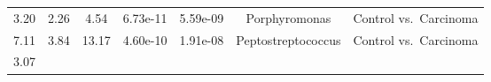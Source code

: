 \documentclass[12pt,]{article}
\begin{document}
\begin{longtable}[]{@{}ccccccc@{}}
\begin{minipage}[t]{0.06\columnwidth}\centering\strut
3.20\strut
\end{minipage} & \begin{minipage}[t]{0.10\columnwidth}\centering\strut
2.26\strut
\end{minipage} & \begin{minipage}[t]{0.10\columnwidth}\centering\strut
4.54\strut
\end{minipage} & \begin{minipage}[t]{0.08\columnwidth}\centering\strut
6.73e-11\strut
\end{minipage} & \begin{minipage}[t]{0.08\columnwidth}\centering\strut
5.59e-09\strut
\end{minipage} & \begin{minipage}[t]{0.23\columnwidth}\centering\strut
Porphyromonas\strut
\end{minipage} & \begin{minipage}[t]{0.16\columnwidth}\centering\strut
Control vs.~Carcinoma\strut
\end{minipage}\tabularnewline
\begin{minipage}[t]{0.06\columnwidth}\centering\strut
7.11\strut
\end{minipage} & \begin{minipage}[t]{0.10\columnwidth}\centering\strut
3.84\strut
\end{minipage} & \begin{minipage}[t]{0.10\columnwidth}\centering\strut
13.17\strut
\end{minipage} & \begin{minipage}[t]{0.08\columnwidth}\centering\strut
4.60e-10\strut
\end{minipage} & \begin{minipage}[t]{0.08\columnwidth}\centering\strut
1.91e-08\strut
\end{minipage} & \begin{minipage}[t]{0.23\columnwidth}\centering\strut
Peptostreptococcus\strut
\end{minipage} & \begin{minipage}[t]{0.16\columnwidth}\centering\strut
Control vs.~Carcinoma\strut
\end{minipage}\tabularnewline
\begin{minipage}[t]{0.06\columnwidth}\centering\strut
3.07\strut
\end{minipage} & \begin{minipage}[t]{0.10\columnwidth}\centering\strut

\end{minipage}
\end{longtable}
\end{document}
